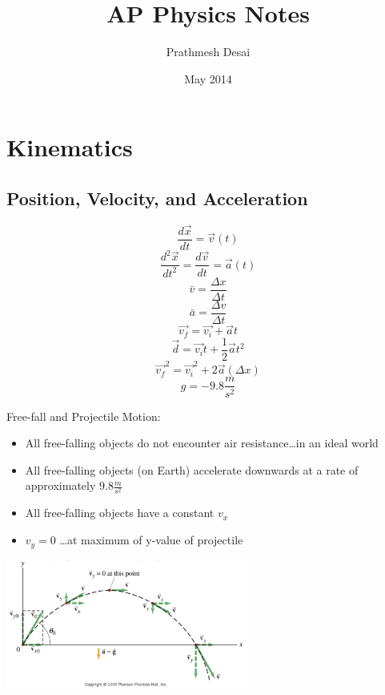 \documentclass{article}
\title{AP Physics Notes}
\author{Prathmesh Desai}
\date{May 2014}
\begin{document}
\maketitle
\tableofcontents
\newpage
\section{Kinematics}
	\subsection{Position, Velocity, and Acceleration}
    	\begin{multicols}{2}
    		\[
            	\frac{d\vec{x}}{dt}=\vec{v}(t)
            \]
    		\[
            	\frac{d^2\vec{x}}{dt^2}=\frac{d\vec{v}}{dt}=\vec{a}(t)
            \]
    		\[
            	\bar{v}=\frac{\Delta{x}}{\Delta{t}}
            \]
    		\[
            	\bar{a}=\frac{\Delta{v}}{\Delta{t}}
            \]
    		\[
            	\vec{v_f}=\vec{v_i}+\vec{a}t
            \]
    		\[
            	\vec{d}=\vec{v_i}t+\frac{1}{2}\vec{a}t^2
            \]
    		\[
            	\vec{v_f}^2=\vec{v_i}^2+2\vec{a}(\Delta{x})
            \]
    		\[
            	g=-9.8\frac{m}{s^2}
            \]
    
    		\columnbreak
    
    		Free-fall and Projectile Motion:
    		\vspace{3mm}
    		\begin{itemize}
    			\item All free-falling objects do not encounter air resistance\ldots in an ideal world
    			\item All free-falling objects (on Earth) accelerate downwards at a rate of approximately $9.8\frac{m}{s^2}$
    			\item All free-falling objects have a constant $v_x$
    			\item $v_y=0$ \ldots at maximum of y-value of projectile
    		\end{itemize}
    
    		\vspace{2ex}
    		\includegraphics[width=8cm]{ProjectileMotion.jpg}
    	\end{multicols}
\end{document}

